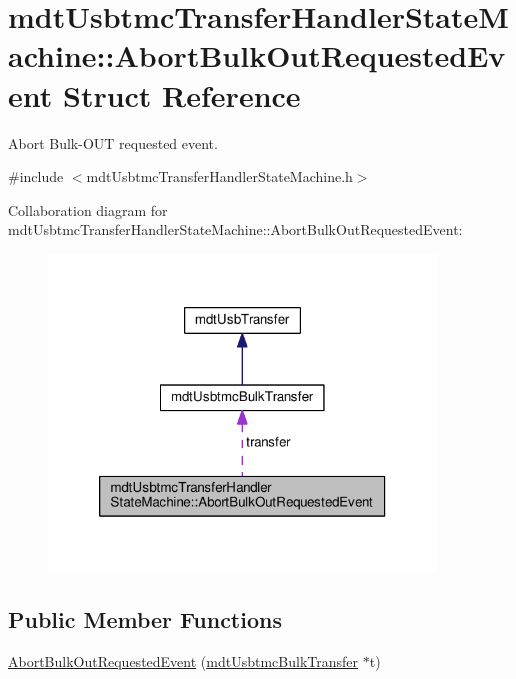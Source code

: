 \hypertarget{structmdt_usbtmc_transfer_handler_state_machine_1_1_abort_bulk_out_requested_event}{\section{mdt\-Usbtmc\-Transfer\-Handler\-State\-Machine\-:\-:Abort\-Bulk\-Out\-Requested\-Event Struct Reference}
\label{structmdt_usbtmc_transfer_handler_state_machine_1_1_abort_bulk_out_requested_event}
}


Abort Bulk-\/\-O\-U\-T requested event.  




{\ttfamily \#include $<$mdt\-Usbtmc\-Transfer\-Handler\-State\-Machine.\-h$>$}



Collaboration diagram for mdt\-Usbtmc\-Transfer\-Handler\-State\-Machine\-:\-:Abort\-Bulk\-Out\-Requested\-Event\-:
\nopagebreak
\begin{figure}[H]
\begin{center}
\leavevmode
\includegraphics[width=292pt]{structmdt_usbtmc_transfer_handler_state_machine_1_1_abort_bulk_out_requested_event__coll__graph}
\end{center}
\end{figure}
\subsection*{Public Member Functions}
\begin{DoxyCompactItemize}
\item 
\hyperlink{structmdt_usbtmc_transfer_handler_state_machine_1_1_abort_bulk_out_requested_event_a58ae92d0b040033461710ef87789104c}{Abort\-Bulk\-Out\-Requested\-Event} (\hyperlink{classmdt_usbtmc_bulk_transfer}{mdt\-Usbtmc\-Bulk\-Transfer} $\ast$t)
\end{DoxyCompactItemize}

